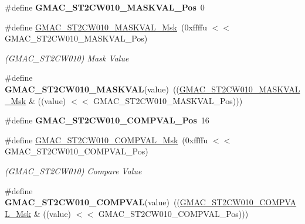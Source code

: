 \begin{DoxyCompactItemize}
\#define {\bfseries G\+M\+A\+C\+\_\+\+S\+T2\+C\+W010\+\_\+\+M\+A\+S\+K\+V\+A\+L\+\_\+\+Pos}~0
\item 
\mbox{\label{group__SAME70__GMAC_ga4d0c11137d266385ce53bc920ac04144}} 
\#define \mbox{\hyperlink{group__SAME70__GMAC_ga4d0c11137d266385ce53bc920ac04144}{G\+M\+A\+C\+\_\+\+S\+T2\+C\+W010\+\_\+\+M\+A\+S\+K\+V\+A\+L\+\_\+\+Msk}}~(0xffffu $<$$<$ G\+M\+A\+C\+\_\+\+S\+T2\+C\+W010\+\_\+\+M\+A\+S\+K\+V\+A\+L\+\_\+\+Pos)
\begin{DoxyCompactList}\small\item\em (G\+M\+A\+C\+\_\+\+S\+T2\+C\+W010) Mask Value \end{DoxyCompactList}\item 
\mbox{\label{group__SAME70__GMAC_gae246634a433e3077fc53daedb2eb0d35}} 
\#define {\bfseries G\+M\+A\+C\+\_\+\+S\+T2\+C\+W010\+\_\+\+M\+A\+S\+K\+V\+AL}(value)~((\mbox{\hyperlink{group__SAMV71__GMAC_ga4d0c11137d266385ce53bc920ac04144}{G\+M\+A\+C\+\_\+\+S\+T2\+C\+W010\+\_\+\+M\+A\+S\+K\+V\+A\+L\+\_\+\+Msk}} \& ((value) $<$$<$ G\+M\+A\+C\+\_\+\+S\+T2\+C\+W010\+\_\+\+M\+A\+S\+K\+V\+A\+L\+\_\+\+Pos)))
\item 
\mbox{\label{group__SAME70__GMAC_gaa515177736a3b0934bc239936f21034b}} 
\#define {\bfseries G\+M\+A\+C\+\_\+\+S\+T2\+C\+W010\+\_\+\+C\+O\+M\+P\+V\+A\+L\+\_\+\+Pos}~16
\item 
\mbox{\label{group__SAME70__GMAC_ga4701b7e736bd16894d3adbd39df6cb4d}} 
\#define \mbox{\hyperlink{group__SAME70__GMAC_ga4701b7e736bd16894d3adbd39df6cb4d}{G\+M\+A\+C\+\_\+\+S\+T2\+C\+W010\+\_\+\+C\+O\+M\+P\+V\+A\+L\+\_\+\+Msk}}~(0xffffu $<$$<$ G\+M\+A\+C\+\_\+\+S\+T2\+C\+W010\+\_\+\+C\+O\+M\+P\+V\+A\+L\+\_\+\+Pos)
\begin{DoxyCompactList}\small\item\em (G\+M\+A\+C\+\_\+\+S\+T2\+C\+W010) Compare Value \end{DoxyCompactList}\item 
\mbox{\label{group__SAME70__GMAC_gab84d35c9c5ea53ee2d35a56b84c54e58}} 
\#define {\bfseries G\+M\+A\+C\+\_\+\+S\+T2\+C\+W010\+\_\+\+C\+O\+M\+P\+V\+AL}(value)~((\mbox{\hyperlink{group__SAMV71__GMAC_ga4701b7e736bd16894d3adbd39df6cb4d}{G\+M\+A\+C\+\_\+\+S\+T2\+C\+W010\+\_\+\+C\+O\+M\+P\+V\+A\+L\+\_\+\+Msk}} \& ((value) $<$$<$ G\+M\+A\+C\+\_\+\+S\+T2\+C\+W010\+\_\+\+C\+O\+M\+P\+V\+A\+L\+\_\+\+Pos)))

\end{DoxyCompactItemize}
